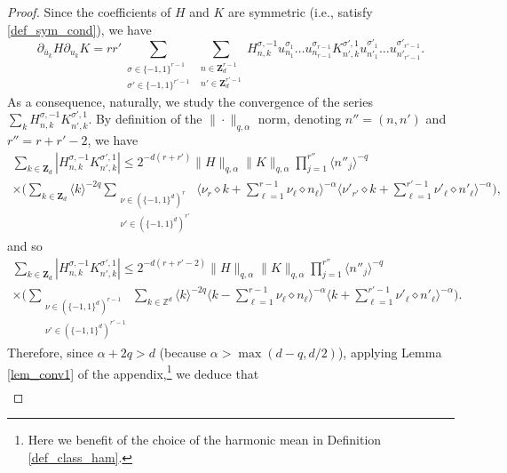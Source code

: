 \documentclass[11pt]{article}
\newcommand{\ie}{i.e.,\xspace}
\theoremstyle{definition}
\begin{document}
\begin{proof}
Since the coefficients of $H$ and $K$ are symmetric (\ie satisfy \eqref{def_sym_cond}), we have
\begin{equation}
\label{eq_a_tue_un_chasseur}
\partial_{\bar{u}_k} H \partial_{u_k} K = r r' \sum_{\substack{\sigma \in \{-1,1\}^{r-1}\\ \sigma' \in \{-1,1\}^{r'-1} }} \sum_{\substack{n\in \mathbf{Z}_d^{r-1} \\ n'\in \mathbf{Z}_d^{r'-1} }} H_{n,k}^{\sigma,-1} u_{n_1}^{\sigma_1} \dots u_{n_{r-1}}^{\sigma_{r-1}} K_{n',k}^{\sigma',1} u_{n'_1}^{\sigma'_1} \dots u_{n'_{r'-1}}^{\sigma'_{r'-1}}.
\end{equation}
As a consequence, naturally, we study the convergence of the series $\sum_k H_{n,k}^{\sigma,-1} K_{n',k}^{\sigma',1}$. By definition of the $\| \cdot \|_{q,\alpha}$ norm, denoting $n''=(n,n')$ and $r''=r+r'-2$, we have
\begin{multline*}
\sum_{k\in \mathbf{Z}_d}|H_{n,k}^{\sigma,-1} K_{n',k}^{\sigma',1}| \leq 2^{-d(r+r')} \| H \|_{q,\alpha} \|K \|_{q,\alpha}\prod_{j=1}^{r''}\langle n''_j \rangle^{-q} \\
\times \biggl(\sum_{k\in \mathbf{Z}_d} \langle k \rangle^{-2q} \sum_{\substack{\nu \in (\{-1,1\}^d)^r \\ \nu' \in (\{-1,1\}^d)^{r'} } } \big\langle \nu_{r} \diamond k + \sum_{\ell =1}^{r-1} \nu_{\ell} \diamond n_{\ell} \big\rangle^{-\alpha} \big\langle \nu'_{r'} \diamond k + \sum_{\ell =1}^{r'-1} \nu'_{\ell} \diamond n'_{\ell} \big\rangle^{-\alpha} \biggr),
\end{multline*}
and so
\begin{multline*}
\sum_{k\in \mathbf{Z}_d}|H_{n,k}^{\sigma,-1} K_{n',k}^{\sigma',1}| \leq 2^{-d(r+r'-2)} \| H \|_{q,\alpha} \|K \|_{q,\alpha}\prod_{j=1}^{r''} \langle n''_j \rangle^{-q} \\
\times \biggl(\sum_{\substack{\nu \in (\{-1,1\}^d)^{r-1} \\ \nu' \in (\{-1,1\}^d)^{r'-1} } } \sum_{k\in \mathbb{Z}^d} \langle k \rangle^{-2q} \big\langle k - \sum_{\ell =1}^{r-1} \nu_{\ell} \diamond n_{\ell} \big\rangle^{-\alpha} \big\langle k + \sum_{\ell =1}^{r'-1} \nu'_{\ell} \diamond n'_{\ell} \big\rangle^{-\alpha} \biggr).
\end{multline*}
Therefore, since $\alpha+2q>d$ (because $\alpha>\max(d-q,d/2)$), applying Lemma \ref{lem_conv1} of the appendix,\footnote{Here we benefit of the choice of the harmonic mean in Definition \ref{def_class_ham}.} we deduce that
\begin{multline}
\label{eq_lugaru}

\end{multline}
\end{proof}
\end{document}
